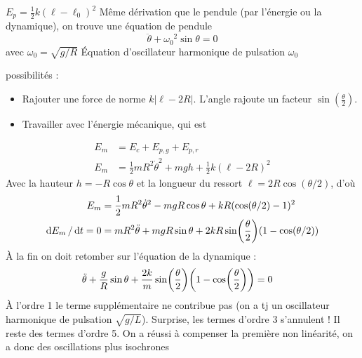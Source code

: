 \begin{solution}

\begin{questions}
    \questioncours $E_p = \frac12 k (\ell-\ell_0)^2$
    \question Même dérivation que le pendule (par l'énergie ou la dynamique), on trouve une équation de pendule
    $$ \ddot \theta + {\omega_0}^2\sin \theta = 0$$
    avec $\omega_0 = \sqrt{g / R}$
    \question Équation d'oscillateur harmonique de pulsation $\omega_0$

     possibilités : 
    \begin{itemize}
        \item Rajouter une force de norme $k |\ell - 2R|$. L'angle rajoute un facteur $\sin(\frac\theta2)$.
        
        \item Travailler avec l'énergie mécanique, qui est
    \end{itemize}
    \begin{align*}
    E_m &= E_c + E_{p,g} + E_{p, r} \\
        E_m &= \frac12m R^2\dot{\theta}^2 + mgh + \frac12 k (\ell - 2R)^2
    \end{align*}
    Avec la hauteur $h = - R\cos \theta$ et la longueur du ressort $\ell = 2R \cos(\theta/2)$, d'où
    \begin{align*}
        E_m &= \frac12m R^2\dot{\theta}^2 - mgR\cos\theta + kR (\cos(\theta/2) - 1)^2 \\
        \dd{E_m}/\dd{t} = 0 &= mR^2 \ddot\theta + mgR\sin\theta + 2 kR \sin(\frac{\theta}2)\qty(1 - \cos(\theta/2))
    \end{align*}
    À la fin on doit retomber sur l'équation de la dynamique :
    \begin{align*}
        \ddot{\theta} + \frac{g}{R} \sin\theta + \frac{2k}{m} \sin(\frac{\theta}2)\qty(1 - \cos(\frac{\theta}2)) &= 0
    \end{align*}
    \question À l'ordre 1 le terme supplémentaire ne contribue pas (on a tj un oscillateur harmonique de pulsation $\sqrt{g/L}$). Surprise, les termes d'ordre 3 s'annulent ! Il reste des termes d'ordre 5.
    \question On a réussi à compenser la première non linéarité, on a donc des oscillations plus isochrones

\end{questions}
\end{solution}